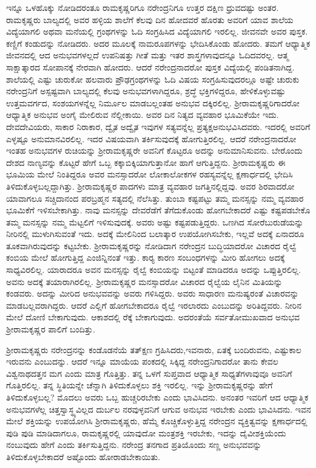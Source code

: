 ಇನ್ನೂ ಒಳಹೊಕ್ಕು ನೋಡಿದರಂತೂ ರಾಮಕೃಷ್ಣರಿಗೂ ನರೇಂದ್ರನಿಗೂ ಉತ್ತರ ದಕ್ಷಿಣ ಧ್ರುವದಷ್ಟು ಅಂತರ. ರಾಮಕೃಷ್ಣರು ಬಾಲ್ಯದಲ್ಲಿ ಅವರ ಹಳ್ಳಿಯ ಶಾಲೆಗೆ ಕೆಲವು ದಿನ ಹೋದವರೆ ಹೊರತು ಅವರಿಗೆ ಯಾವ ಶಾಲೆಯ ವಿದ್ಯೆಯಾಗಲಿ ಅಥವಾ ಮನೆಯಲ್ಲಿ ಗ್ರಂಥಗಳನ್ನು ಓದಿ ಸಂಗ್ರಹಿಸಿದ ವಿದ್ಯೆಯಾಗಲಿ ಇರಲಿಲ್ಲ. ಜೀವನವೇ ಅವರ ಪುಸ್ತಕ. ಕಣ್ಣಿಗೆ ಕಂಡುದನ್ನು ನೋಡಿದರು. ಅದರ ಮೂಲಕ್ಕೆ ನಾಮರೂಪಗಳನ್ನು ಭೇದಿಸಿಕೊಂಡು ಹೋದರು. ತಮಗೆ ಆಧ್ಯಾತ್ಮಿಕ ಜೀವನದಲ್ಲಿ ಆದ ಅನುಭವಗಳಲ್ಲದೆ ಉಪನಿಷತ್ತು ಗೀತೆ ಮತ್ತು ಇತರ ಶಾಸ್ತ್ರಗಳಾವುದನ್ನೂ ಓದಿದವರಲ್ಲ. ಆತ್ಮ ಸಾಕ್ಷಾತ್ಕಾರದ ಸೋಪಾನಕ್ಕೆ ನೇರವಾಗಿ ಹೋದರು. ಆದರೆ ನರೇಂದ್ರನಾದರೋ ಪುಸ್ತಕ ವಿದ್ಯೆಯಲ್ಲಿ ಪಂಡಿತನಾಗಿದ್ದ. ಶಾಲೆಯಲ್ಲಿ ಎಷ್ಟು ಚುರುಕೋ ಹಲವಾರು ಪ್ರೌಢಗ್ರಂಥಗಳನ್ನು ಓದಿ ವಿಷಯ ಸಂಗ್ರಹಿಸುವುದರಲ್ಲೂ ಅಷ್ಟೇ ಚುರುಕು ನರೇಂದ್ರನಿಗೆ ಅಸ್ಪಷ್ಟವಾಗಿ ಬಾಲ್ಯದಲ್ಲಿ ಕೆಲವು ಅನುಭವಗಳಾಗಿದ್ದರೂ, ಶ್ರದ್ಧೆ ಭಕ್ತಿಗಳಿದ್ದರೂ, ಹೇಳಿಕೊಳ್ಳುವಷ್ಟು ಉತ್ತಮವರ್ಗದ, ಸಂಶಯಗಳನ್ನೆಲ್ಲ ನಿರ್ಮೂಲ ಮಾಡಬಲ್ಲಂತಹ ಅನುಭವ ದಕ್ಕಿರಲಿಲ್ಲ. ಶ‍್ರೀರಾಮಕೃಷ್ಣರಿಗಾದರೋ ಆಧ್ಯಾತ್ಮಿಕ ಅನುಭವ ಅಂಗೈ ಮೇಲಿರುವ ನೆಲ್ಲೀಕಾಯಿ. ಅವರ ದಿನ ನಿತ್ಯದ ವ್ಯವಹಾರ ಭೂಮಿಕೆಯೇ ಇದು. ದೇವದೇವಿಯರು, ಸಾಕಾರ ನಿರಾಕಾರ, ದ್ವೈತ ಅದ್ವೈತ ಇವುಗಳ ಸತ್ಯವನ್ನೆಲ್ಲ ಪ್ರತ್ಯಕ್ಷ\break ಅನುಭವಿಸಿದವರು. ಇದರಲ್ಲಿ ಅವರಿಗೆ ಎಳ್ಳಷ್ಟೂ ಅನುಮಾನವಿರಲಿಲ್ಲ. ಇದರ ವಿಷಯವಾಗಿ ತರ್ಕಿಸುವುದಕ್ಕೆ ಹೋಗುತ್ತಿರಲಿಲ್ಲ. ಆದರೆ ನರೇಂದ್ರನಾದರೋ ಇಂತಹ ಅನುಭವಗಳ ರುಚಿಯನ್ನು ಶ‍್ರೀರಾಮಕೃಷ್ಣರೇ ಅವನಿಗೆ ಕೊಟ್ಟರೂ ಅದನ್ನು ಅನುಮಾನಿಸುವನು. ಬೇರೊಂದು ದೇಶದ ನಾಣ್ಯವನ್ನು ಕೊಟ್ಟರೆ ಹೇಗೆ ಒಬ್ಬ ಕಕ್ಕಾಬಿಕ್ಕಿಯಾಗುತ್ತಾನೋ ಹಾಗೆ ಆಗುತ್ತಿದ್ದನು. ಶ‍್ರೀರಾಮಕೃಷ್ಣರು ಈ ಭೂಮಿಯ ಮೇಲೆ ನಿಂತಿದ್ದರೂ ಅವರ ಮನಸ್ಸಾದರೋ ಲೋಕಾಲೋಕಗಳ ರಹಸ್ಯವನ್ನೆಲ್ಲ ಕ್ಷಣಾರ್ಧದಲ್ಲಿ ಭೇದಿಸಿ ತಿಳಿದುಕೊಳ್ಳಬಲ್ಲದ್ದಾಗಿತ್ತು. ಶ‍್ರೀರಾಮಕೃಷ್ಣರ ಪಾದಗಳು ಮಾತ್ರ ವ್ಯವಹಾರ ಜಗತ್ತಿನಲ್ಲಿದ್ದವು. ಅವರ ಶಿರವಾದರೋ ಯಾವಾಗಲೂ ಸಚ್ಚಿದಾನಂದ ಪರಬ್ರಹ್ಮನ ಸತ್ಯದಲ್ಲಿ ನೆಲೆಸಿತ್ತು. ತುಂಬಾ ಕಷ್ಟಪಟ್ಟು ತಮ್ಮ ಮನಸ್ಸನ್ನು ನಮ್ಮ ವ್ಯವಹಾರ ಭೂಮಿಕೆಗೆ ಇಳಿಸಬೇಕಾಗಿತ್ತು. ನಾವು ಮನಸ್ಸನ್ನು ದೇವರೆಡೆಗೆ ತೆಗೆದುಕೊಂಡು ಹೋಗಬೇಕಾದರೆ ಎಷ್ಟು ಕಷ್ಟಪಡಬೇಕೊ ತಮ್ಮ ಮನಸ್ಸನ್ನು ನಮ್ಮ ಮೆಟ್ಟಲಿಗೆ ಇಳಿಸುವುದಕ್ಕೆ. ಅವರು ಅಷ್ಟು ಕಷ್ಟಪಡುತ್ತಿದ್ದರು. ಒಣಗಿದ ಸೋರೆಬುರುಡೆಯನ್ನು ನೀರಿನಲ್ಲಿ ಮುಳುಗಿಸುವಂತೆ ಇದು. ಅದಕ್ಕೆ ಮೇಲಿನಿಂದ ಬಲಾತ್ಕಾರ ಉಪಯೋಗಿಸಬೇಕು, ಇಲ್ಲವೆ ಅದಕ್ಕೆ ಏನಾದರೂ ತೂಕವಾಗಿರುವುದನ್ನು ಕಟ್ಟಬೇಕು. ಶ‍್ರೀರಾಮಕೃಷ್ಣರನ್ನು ನೋಡಿದಾಗ ನರೇಂದ್ರನ ಬುದ್ಧಿಯಾದರೋ ವಿಚಾರದ ರೈಲ್ವೆ ಕಂಬಿಯ ಮೇಲೆ ಹೋಗುತ್ತಿದ್ದ ಎಂಜಿನ್ನಿನಂತೆ ಇತ್ತು. ಕಾರ‍್ಯ ಕಾರಣ ಸಂಬಂಧಗಳನ್ನು ಮೀರಿ ಹೋಗಲು ಅದಕ್ಕೆ ಸಾಧ್ಯವಿರಲಿಲ್ಲ. ಯಾರಾದರೂ ಅವನ ಮನಸ್ಸನ್ನು ರೈಲ್ವೆ ಕಂಬಿಯನ್ನು ಬಿಟ್ಟಂತೆ ಮಾಡಿದರೂ ಅದನ್ನು ಒಪ್ಪುತ್ತಿರಲಿಲ್ಲ. ಅವನು ಅದಕ್ಕೆ ತಯಾರಾಗಿರಲಿಲ್ಲ. ಶ‍್ರೀರಾಮಕೃಷ್ಣರ ಮನಸ್ಸಾದರೋ ವಿಚಾರದ ರೈಲ್ವೆಯ ಲೈನಿನ ಮಿತಿಯನ್ನು ಕಂಡವರು. ಅದನ್ನು ಮೀರಿದ ಅನುಭವವನ್ನು ಅವರು ಗಳಿಸಿದ್ದರು. ಅವರು ಸಾಧಾರಣ ಮನುಷ್ಯರಂತೆ ವಿಚಾರವನ್ನು ಮಾಡಬಲ್ಲವರಾಗಿದ್ದರು. ಆದರೆ ಎಲ್ಲಿಗೆ ಹೋಗಬೇಕಾದರೂ ರೈಲ್ವೆ ಇರಲಾರದು ಎಂಬುದನ್ನು ಅರಿತಿದ್ದವರು. ನೀರಿನ ಮೇಲೆ ದೋಣಿ ಬೇಕಾಗುವುದು. ಆಕಾಶದಲ್ಲಿ ರೆಕ್ಕೆ ಬೇಕಾಗುವುದು. ಅದರಂತೆಯೆ ಸರ್ವತೋಮುಖವಾದ ಅನುಭವ ಶ‍್ರೀರಾಮಕೃಷ್ಣರ ಪಾಲಿಗೆ ಬಂದಿತ್ತು.

ಶ‍್ರೀರಾಮಕೃಷ್ಣರು ನರೇಂದ್ರನನ್ನು ಕಂಡೊಡನೆಯೆ ತತ್‍ಕ್ಷಣ ಗ್ರಹಿಸಿದರು,\break ಇವನಾರು, ಏತಕ್ಕೆ ಬಂದಿರುವನು, ಎಷ್ಟುಕಾಲ ಇರುವನು ಎಂಬುದನ್ನು. ಆದರೆ ಇನ್ನೂ ಮಾಯೆಯ ಪಂಕದಲ್ಲಿ ಸಿಕ್ಕಿದ್ದ ನರೇಂದ್ರನಿಗಾದರೋ ತಾನು ಕೇವಲ ವಿಶ್ವನಾಥದತ್ತನ ಮಗ ಎಂದು ಮಾತ್ರ ಗೊತ್ತಿತ್ತು. ತನ್ನ ಒಳಗೆ ಸುಪ್ತವಾದ ಆಧ್ಯಾತ್ಮಿಕ ಸಾಧ್ಯತೆಗಳಾವುವೂ ಅವನಿಗೆ ಗೊತ್ತಿರಲಿಲ್ಲ. ತನ್ನ ಸ್ಥಿತಿಯನ್ನೇ ಚೆನ್ನಾಗಿ ತಿಳಿದುಕೊಳ್ಳಲು ಶಕ್ತಿ ಇರಲಿಲ್ಲ. ಇನ್ನು ಶ‍್ರೀರಾಮಕೃಷ್ಣರನ್ನು ಹೇಗೆ ತಿಳಿದುಕೊಳ್ಳಬಲ್ಲ? ಮೊದಲು ಅವರು ಒಬ್ಬ ಹುಚ್ಚರಿರಬೇಕು ಎಂದು ಭಾವಿಸಿದನು. ಅನಂತರ ಇವರಿಗೆ ಆದ ಆಧ್ಯಾತ್ಮಿಕ ಅನುಭವಗಳೆಲ್ಲ ಚಿತ್ತಸ್ವಾಸ್ಥ್ಯವಿಲ್ಲದ ದುರ್ಬಲ ನರವುಳ್ಳವನಿಗೆ ಆಗುವ ಅನುಭವ ಇರಬೇಕು ಎಂದು ಭಾವಿಸಿದನು. ಇವನ ಮೇಲೆ ಶಕ್ತಿಯನ್ನು ಉಪಯೋಗಿಸಿ ಶ‍್ರೀರಾಮಕೃಷ್ಣರು, ಹೆಮ್ಮೆ ಕೊಚ್ಚಿಕೊಳ್ಳುತ್ತಿದ್ದ ನರೇಂದ್ರನ ವ್ಯಕ್ತಿತ್ವವನ್ನು ಕ್ಷಣಾರ್ಧದಲ್ಲಿ ಪುಡಿ ಪುಡಿ ಮಾಡಿದಾಗಲೂ, ರಾಮಕೃಷ್ಣರಲ್ಲಿ ಯಾವುದೋ ಮಂತ್ರಶಕ್ತಿ ಇರಬೇಕು, ಇದನ್ನು ದೈವೀಶಕ್ತಿಯೆಂದು ನಂಬುವುದು ಹೇಗೆ ಎಂದು ತರ್ಕಿಸುತ್ತಿದ್ದನು. ನರೇಂದ್ರ ತನಗಾದ ಪ್ರತಿಯೊಂದು ಸಣ್ಣ ಅನುಭವವನ್ನು ತಿಳಿದುಕೊಳ್ಳಬೇಕಾದರೆ ಅಷ್ಟೊಂದು ಹೋರಾಡಬೇಕಾಯಿತು.

